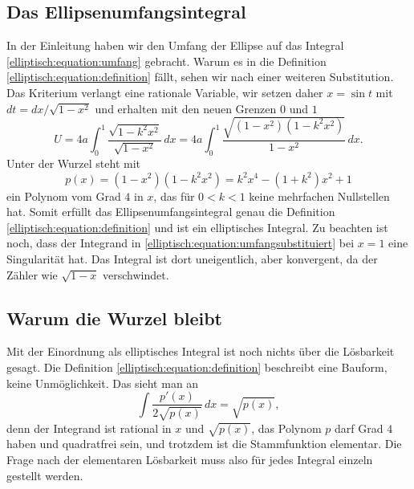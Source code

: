 \subsection{Das Ellipsenumfangsintegral}
In der Einleitung haben wir den Umfang der Ellipse auf das Integral
\eqref{elliptisch:equation:umfang} gebracht.
Warum es in die Definition \eqref{elliptisch:equation:definition}
fällt, sehen wir nach einer weiteren Substitution.
Das Kriterium verlangt eine rationale Variable, wir setzen daher
$x = \sin t$ mit $dt = dx/\sqrt{1-x^2}$ und erhalten mit den neuen
Grenzen $0$ und $1$
\begin{equation}
U
=
4a \int_0^1 \frac{\sqrt{1-k^2x^2}}{\sqrt{1-x^2}}\,dx
=
4a \int_0^1
\frac{\sqrt{(1-x^2)(1-k^2x^2)}}{1-x^2}\,dx.
\label{elliptisch:equation:umfangsubstituiert}
\end{equation}
Unter der Wurzel steht mit
\begin{equation}
p(x)
=
(1-x^2)(1-k^2x^2)
=
k^2x^4 - (1+k^2)x^2 + 1
\label{elliptisch:equation:gradvier}
\end{equation}
ein Polynom vom Grad $4$ in $x$, das für $0 < k < 1$ keine
mehrfachen Nullstellen hat.
Somit erfüllt das Ellipsenumfangsintegral genau die Definition
\eqref{elliptisch:equation:definition} und ist ein elliptisches
Integral.
Zu beachten ist noch, dass der Integrand in
\eqref{elliptisch:equation:umfangsubstituiert} bei $x = 1$ eine
Singularität hat.
Das Integral ist dort uneigentlich, aber konvergent, da der Zähler
wie $\sqrt{1-x}$ verschwindet.

\subsection{Warum die Wurzel bleibt
\label{elliptisch:subsection:wurzelbleibt}}

Mit der Einordnung als elliptisches Integral ist noch nichts über
die Lösbarkeit gesagt.
Die Definition \eqref{elliptisch:equation:definition} beschreibt eine
Bauform, keine Unmöglichkeit.
Das sieht man an
\begin{equation}
\int \frac{p'(x)}{2\sqrt{p(x)}}\,dx
=
\sqrt{p(x)},
\label{elliptisch:equation:zufallelementar}
\end{equation}
denn der Integrand ist rational in $x$ und $\sqrt{p(x)}$, das
Polynom $p$ darf Grad $4$ haben und quadratfrei sein, und trotzdem
ist die Stammfunktion elementar.
Die Frage nach der elementaren Lösbarkeit muss also für jedes
Integral einzeln gestellt werden.

